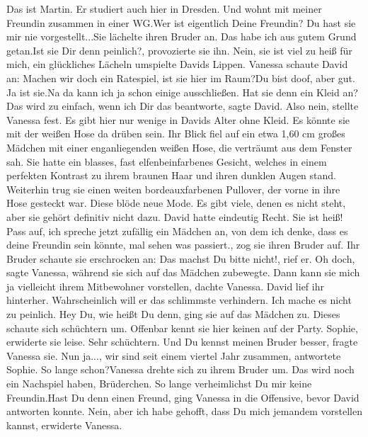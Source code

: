 \documentclass{article}
\begin{document}
	\guillemotright Das ist Martin. Er studiert auch hier in Dresden. Und wohnt mit meiner Freundin zusammen in einer WG.\guillemotleft \guillemotright Wer ist eigentlich Deine Freundin? Du hast sie mir nie vorgestellt...\guillemotleft  Sie lächelte ihren Bruder an. \guillemotright Das habe ich aus gutem Grund getan.\guillemotleft \guillemotright Ist sie Dir denn peinlich?\guillemotleft, provozierte sie ihn. \guillemotright Nein, sie ist viel zu heiß für mich\guillemotleft, ein glückliches Lächeln umspielte Davids Lippen. Vanessa schaute David an: \guillemotright Machen wir doch ein Ratespiel, ist sie hier im Raum?\guillemotleft \guillemotright Du bist doof, aber gut. Ja ist sie.\guillemotleft  Na da kann ich ja schon einige ausschließen. \guillemotright Hat sie denn ein Kleid an?\guillemotleft \guillemotright Das wird zu einfach, wenn ich Dir das beantworte\guillemotleft, sagte David. \guillemotright Also nein\guillemotleft, stellte Vanessa fest. Es gibt hier nur wenige in Davids Alter ohne Kleid. Es könnte sie mit der weißen Hose da drüben sein. Ihr Blick fiel auf ein etwa 1,60 cm großes Mädchen mit einer enganliegenden weißen Hose, die verträumt aus dem Fenster sah. Sie hatte ein blasses, fast elfenbeinfarbenes Gesicht, welches in einem perfekten Kontrast zu ihrem braunen Haar und ihren dunklen Augen stand. Weiterhin trug sie einen weiten bordeauxfarbenen Pullover, der vorne in ihre Hose gesteckt war. Diese blöde neue Mode. Es gibt viele, denen es nicht steht, aber sie gehört definitiv nicht dazu. David hatte eindeutig Recht. Sie ist heiß! \guillemotright Pass auf, ich spreche jetzt zufällig ein Mädchen an, von dem ich denke, dass es deine Freundin sein könnte, mal sehen was passiert.\guillemotleft, zog sie ihren Bruder auf. Ihr Bruder schaute sie erschrocken an: \guillemotright Das machst Du bitte nicht!\guillemotleft, rief er. \guillemotright Oh doch\guillemotleft, sagte Vanessa, während sie sich auf das Mädchen zubewegte. Dann kann sie mich ja vielleicht ihrem Mitbewohner vorstellen, dachte Vanessa. David lief ihr hinterher. Wahrscheinlich will er das schlimmste verhindern. Ich mache es nicht zu peinlich. \guillemotright Hey Du, wie heißt Du denn\guillemotleft, ging sie auf das Mädchen zu. Dieses schaute sich schüchtern um. Offenbar kennt sie hier keinen auf der Party. \guillemotright Sophie\guillemotleft, erwiderte sie leise. Sehr schüchtern. \guillemotright Und Du kennst meinen Bruder besser\guillemotleft, fragte Vanessa sie. \guillemotright Nun ja..., wir sind seit einem viertel Jahr zusammen\guillemotleft, antwortete Sophie. \guillemotright So lange schon?\guillemotleft  Vanessa drehte sich zu ihrem Bruder um. \guillemotright Das wird noch ein Nachspiel haben, Brüderchen. So lange verheimlichst Du mir keine Freundin.\guillemotleft \guillemotright Hast Du denn einen Freund\guillemotleft, ging Vanessa in die Offensive, bevor David antworten konnte. \guillemotright Nein, aber ich habe gehofft, dass Du mich jemandem vorstellen kannst\guillemotleft, erwiderte Vanessa.
\end{document}
